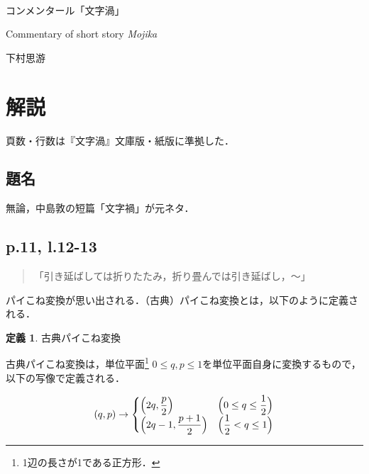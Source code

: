 \documentclass[10pt, a5paper, twoside]{jsarticle}
\theoremstyle{definition}
\newtheorem{dfn}{定義}
\begin{document}
	~ %

	\begin{center}

		\Large{コンメンタール「文字渦」}

		\vspace{3mm}

		\large{Commentary of short story \textit{Mojika}}

		\vspace{3mm}
		
		\large{下村思游}

	\end{center}

	\vspace{3mm}

	\section{解説}

		頁数・行数は『文字渦』文庫版・紙版\cite{mojika}に準拠した．

		\subsection{題名}

		無論，中島敦の短篇「文字禍」が元ネタ．

		\subsection{p.11, l.12-13}

		\begin{quote}
			
			「引き延ばしては折りたたみ，折り畳んでは引き延ばし，〜」
		
		\end{quote}
		
		パイこね変換が思い出される．（古典）パイこね変換とは，以下のように定義される\cite{pie}．

		\begin{dfn}

			古典パイこね変換
			
			古典パイこね変換は，単位平面\footnote{1辺の長さが1である正方形．} $0 \leq q, p \leq 1$を単位平面自身に変換するもので，以下の写像で定義される．
			
			\begin{equation*}
				(q, p) \rightarrow \begin{cases} \Big{(}2q, \displaystyle \frac{p}{2} \Big{)} & \Big{(} 0 \leq q \leq \displaystyle \frac{1}{2} \Big{)} \\ \Big{(} 2q-1, \displaystyle \frac{p+1}{2} \Big{)} & \Big{(} \displaystyle \frac{1}{2} < q \leq 1 \Big{)} \end{cases}
			\end{equation*}

		\end{dfn}
\end{document}

